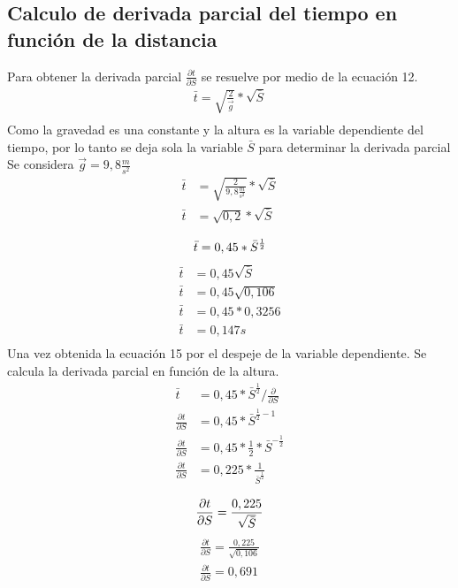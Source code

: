 \documentclass[runningheads]{llncs}
\begin{document}
    \subsection*{Calculo de derivada parcial del tiempo en función de la distancia}
    Para obtener la derivada parcial $\frac{\partial t}{\partial S}$ se resuelve por medio de la ecuación 12.
    \begin{align*}
        \bar{t}=\sqrt{\frac{2}{\overrightarrow{g}}}*\sqrt{\bar{S}}\\
    \end{align*}
    Como la gravedad es una constante y la altura es la variable dependiente del tiempo, por lo tanto se deja sola la variable $\bar{S}$ para determinar la derivada parcial\\
    Se considera $\vec{g}=9,8 \frac{m}{{s}^{2}}$
    \begin{align*}
        \bar{t} & =\sqrt{\frac{2}{{9,8 \frac{m}{{s}^{2}}}}}*\sqrt{\bar{S}}\\
        \bar{t} & =\sqrt{0,2}*\sqrt{\bar{S}}\\ 
    \end{align*}
    \begin{equation}
        \bar{t} =0,45*\bar{S}^{\frac{1}{2}}\\
    \end{equation}
    \begin{align*}
        \bar{t} &=0,45\sqrt{\bar{S}}\\
        \bar{t} &=0,45\sqrt{0,106}\\
        \bar{t} &=0,45*0,3256\\
        \bar{t} &=0,147 s \tag{M}\\
    \end{align*}
    Una vez obtenida la ecuación 15 por el despeje de la variable dependiente. Se calcula la derivada parcial en función de la altura. 
    \begin{align*}
        \bar{t}                          & = 0,45*\bar{S}^{\frac{1}{2}} / \frac{\partial}{\partial S} \\
        \frac{\partial t}{\partial S}    & = 0,45*\bar{S}^{\frac{1}{2}-1}\\
        \frac{\partial t}{\partial S}    & = 0,45*\frac{1}{2}*\bar{S}^{-\frac{1}{2}}\\
        \frac{\partial t}{\partial S}    & = 0,225*\frac{1}{\bar{S}^{\frac{1}{2}}}\\
    \end{align*}
    \begin{equation}
        \frac{\partial t}{\partial S}      = \frac{0,225}{\sqrt{\bar{S}}}\\
    \end{equation}
    \begin{align*}
        \frac{\partial t}{\partial S} = \frac{0,225}{\sqrt{0,106}}\\
        \frac{\partial t}{\partial S} = 0,691 \tag{N}\\
    \end{align*}
\end{document}
